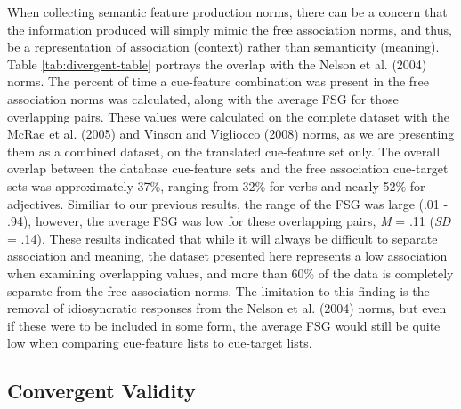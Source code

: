 \documentclass[english,man]{apa6}
\theoremstyle{definition}
\theoremstyle{definition}
\theoremstyle{definition}
\theoremstyle{remark}
\begin{document}
When collecting semantic feature production norms, there can be a
concern that the information produced will simply mimic the free
association norms, and thus, be a representation of association
(context) rather than semanticity (meaning). Table
\ref{tab:divergent-table} portrays the overlap with the Nelson et al.
(2004) norms. The percent of time a cue-feature combination was present
in the free association norms was calculated, along with the average FSG
for those overlapping pairs. These values were calculated on the
complete dataset with the McRae et al. (2005) and Vinson and Vigliocco
(2008) norms, as we are presenting them as a combined dataset, on the
translated cue-feature set only. The overall overlap between the
database cue-feature sets and the free association cue-target sets was
approximately 37\%, ranging from 32\% for verbs and nearly 52\% for
adjectives. Similiar to our previous results, the range of the FSG was
large (.01 - .94), however, the average FSG was low for these
overlapping pairs, \emph{M} = .11 (\emph{SD} = .14). These results
indicated that while it will always be difficult to separate association
and meaning, the dataset presented here represents a low association
when examining overlapping values, and more than 60\% of the data is
completely separate from the free association norms. The limitation to
this finding is the removal of idiosyncratic responses from the Nelson
et al. (2004) norms, but even if these were to be included in some form,
the average FSG would still be quite low when comparing cue-feature
lists to cue-target lists.

\subsection{Convergent Validity}\label{convergent-validity}
\end{document}
